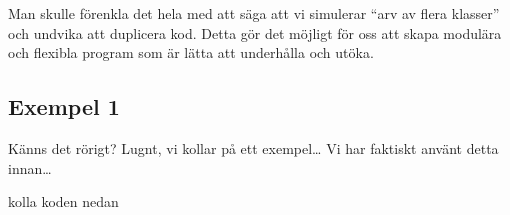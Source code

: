 Man skulle förenkla det hela med att säga att vi simulerar ``arv av
flera klasser'' och undvika att duplicera kod. Detta gör det möjligt för
oss att skapa modulära och flexibla program som är lätta att underhålla
och utöka.

\hypertarget{exempel-1}{%
\subsection{Exempel 1}\label{exempel-1}}

Känns det rörigt? Lugnt, vi kollar på ett exempel\ldots{} Vi har
faktiskt använt detta innan\ldots{}

kolla koden nedan

\hypertarget{cb1}{}
\begin{Shaded}
\begin{Highlighting}[]
\OperatorTok{\{}
     \OperatorTok{;}
     \OperatorTok{;}
     \OperatorTok{;}

     \OperatorTok{(}\OperatorTok{,} \OperatorTok{,} \OperatorTok{)}
    \OperatorTok{\{}
         \OperatorTok{=}\OperatorTok{;}
         \OperatorTok{=}\OperatorTok{;}
         \OperatorTok{=}\OperatorTok{;}
    \OperatorTok{\}}

      \OperatorTok{()\{} \OperatorTok{;} \OperatorTok{\}}
      \OperatorTok{()\{} \OperatorTok{;} \OperatorTok{\}}
      \OperatorTok{()\{} \OperatorTok{;} \OperatorTok{\}}
      \OperatorTok{(}\OperatorTok{)\{}  \OperatorTok{=}\OperatorTok{;} \OperatorTok{\}}
      \OperatorTok{(}\OperatorTok{)\{}  \OperatorTok{=}\OperatorTok{;} \OperatorTok{\}}
      \OperatorTok{(}\OperatorTok{)\{}  \OperatorTok{=}\OperatorTok{;} \OperatorTok{\}}
\OperatorTok{\}}
\OperatorTok{\{}
     \OperatorTok{;}
     \OperatorTok{;}


\end{Highlighting}
\end{Shaded}
